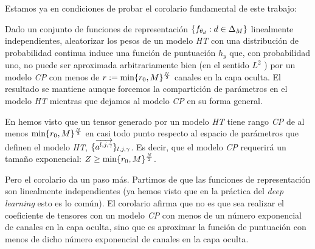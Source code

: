 Estamos ya en condiciones de probar el corolario fundamental de este trabajo:

\begin{corolario} \label{corolario:corolario_principal_concreto}
    Dado un conjunto de funciones de representación $\{ f_{\theta_d}: d \in \Delta_{M} \}$ linealmente independientes, aleatorizar los pesos de un modelo \textit{HT} con una distribución de probabilidad continua induce una función de puntuación $h_y$ que, con probabilidad uno, no puede ser aproximada arbitrariamente bien (en el sentido $L^2$ ) por un modelo \textit{CP} con menos de $r := \min \{ r_0, M \}^{\frac{N}{2}}$ canales en la capa oculta. El resultado se mantiene aunque forcemos la compartición de parámetros en el modelo \textit{HT} mientras que dejamos al modelo \textit{CP} en su forma general.
\end{corolario}

\begin{observacion}
    En  hemos visto que un tensor generado por un modelo \textit{HT} tiene rango \textit{CP} de al menos $\min \{ r_0, M \}^{\frac{N}{2}}$  en casi todo punto respecto al espacio de parámetros que definen el modelo \textit{HT}, $\{ \overrightarrow{a^{l, j, \gamma}} \}_{l, j, \gamma}$. Es decir, que el modelo \textit{CP} requerirá un tamaño exponencial: $Z \geq \min \{ r_0, M \}^{\frac{N}{2}}$.

    Pero el corolario da un paso más. Partimos de que las funciones de representación son linealmente independientes (ya hemos visto que en la práctica del \textit{deep learning} esto es lo común). El corolario afirma que no es que sea  realizar el coeficiente de tensores con un modelo \textit{CP} con menos de un número exponencial de canales en la capa oculta, sino que es  aproximar la función de puntuación con menos de dicho número exponencial de canales en la capa oculta.
\end{observacion}

